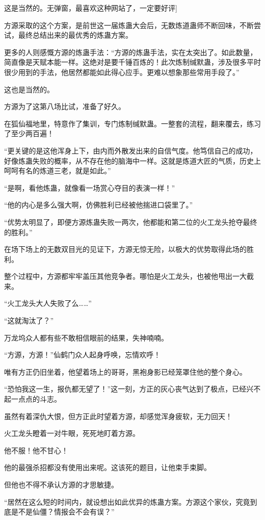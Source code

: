 \begin{this_body}
这是当然的。无弹窗，最喜欢这种网站了，一定要好评]

方源采取的这个方案，是前世这一届炼蛊大会后，无数炼道蛊师不断回味，不断尝试，最终总结出来的最优秀的炼蛊方案。

更多的人则感慨方源的炼蛊手法：“方源的炼蛊手法，实在太突出了。如此数量，简直像是天赋本能一样。这绝对是要千锤百炼的！此次炼制缄默蛊，涉及很多平时很少用到的手法，他居然都能如此得心应手。更难以想象那些常用手段了。”

这也是当然的。

方源为了这第八场比试，准备了好久。

在狐仙福地里，特意作了集训，专门炼制缄默蛊。一整套的流程，翻来覆去，练习了至少两百遍！

“更关键的是这他浑身上下，由内而外散发出来的自信气度。他笃信自己的成功，好像炼蛊失败的概率，从不存在他的脑海中一样。这就是炼道大匠的气质，历史上呵呵有名的炼道三老，就是如此。”

“是啊，看他炼蛊，就像看一场赏心夺目的表演一样！”

“他的内心是多么强大啊，仿佛胜利已经被他揣进口袋里了。”

“优势太明显了，即便方源炼蛊失败一两次，他都能和第二位的火工龙头抢夺最终的胜利。”

在场下场上的无数双目光的见证下，方源无惊无险，以极大的优势取得此场的胜利。

整个过程中，方源都牢牢盖压其他竞争者。哪怕是火工龙头，也被他甩出一大截来。

“火工龙头大人失败了么……”

“这就淘汰了？”

万龙坞众人都有些不敢相信眼前的结果，失神喃喃。

“方源，方源！”仙鹤门众人起身呼唤，忘情欢呼！

唯有方正仍旧坐着，他望着场上的哥哥，黑袍身影已经笼罩住他的整个身心。

“恐怕我这一生，报仇都无望了！”这一刻，方正的灰心丧气达到了极点，已经兴不起一点点的斗志。

虽然有着深仇大恨，但方正此时望着方源，却感觉浑身疲软，无力回天！

火工龙头瞪着一对牛眼，死死地盯着方源。

他不服！他不甘心！

他的最强杀招都没有使用出来呢。这该死的题目，让他束手束脚。

但他也不得不承认方源的才思敏捷。

“居然在这么短的时间内，就设想出如此优异的炼蛊方案。方源这个家伙，究竟到底是不是仙僵？情报会不会有误？”


\end{this_body}
